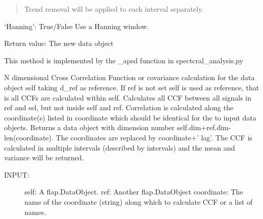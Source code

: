\documentclass[letterpaper,10pt,english]{sphinxmanual}
\begin{document}
\begin{fulllineitems}
\begin{fulllineitems}
\begin{description}
\begin{description}
\begin{description}
\begin{quote}
Trend removal will be applied to each interval separately.
\end{quote}

‘Hanning’: True/False Use a Hanning window.

\end{description}

\end{description}

\end{description}

Return value: The new data object

This method is implemented by the \_apsd function in spectcral\_analysis.py

\end{fulllineitems}


\begin{fulllineitems}
\label{\detokenize{data_object:flap.data_object.DataObject.ccf}}
N dimensional Cross Correlation Function or covariance calculation for the data object self taking d\_ref
as reference. If ref is not set self is used as reference, that is all CCFs are calculated
within self. Calculates all CCF between all signals in ref and sel, but not inside self and ref.
Correlation is calculated along the coordinate(s) listed in coordinate which should be
identical for the to input data objects.
Returns a data object with dimension number self.dim+ref.dim-len(coordinate).
The coordinates are replaced by coordinate+’ lag’.
The CCF is calculated in multiple intervals (described by intervals)
and the mean and variance will be returned.
\begin{description}
\item[{INPUT:}] \leavevmode
self: A flap.DataObject.
ref: Another flap.DataObject
coordinate: The name of the coordinate (string) along which to calculate CCF or a list of names.
\begin{quote}


\end{quote}
\end{description}
\end{fulllineitems}
\end{fulllineitems}
\end{document}
